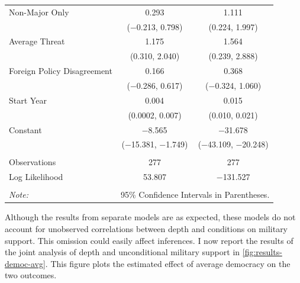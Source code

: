 \documentclass[12pt]{article}
\begin{document}
\begin{table}[!htbp]
\begin{tabular}{@{\extracolsep{5pt}}lcc}
  Non-Major Only & 0.293 & 1.111$^{}$ \\ 
  & ($-$0.213, 0.798) & (0.224, 1.997) \\ 
  Average Threat & 1.175$^{}$ & 1.564$^{}$ \\ 
  & (0.310, 2.040) & (0.239, 2.888) \\ 
  Foreign Policy Disagreement & 0.166 & 0.368 \\ 
  & ($-$0.286, 0.617) & ($-$0.324, 1.060) \\ 
  Start Year & 0.004$^{}$ & 0.015$^{}$ \\ 
  & (0.0002, 0.007) & (0.010, 0.021) \\ 
  Constant & $-$8.565$^{}$ & $-$31.678$^{}$ \\ 
  & ($-$15.381, $-$1.749) & ($-$43.109, $-$20.248) \\ 
 \hline \\[-1.8ex] 
Observations & 277 & 277 \\ 
Log Likelihood & 53.807 & $-$131.527 \\ 
\hline 
\hline \\[-1.8ex] 
\textit{Note:}  & \multicolumn{2}{r}{95\% Confidence Intervals in Parentheses.} \\ 
\end{tabular} 
\end{table} 

Although the results from separate models are as expected, these models do not account for unobserved correlations between depth and conditions on military support. 
This omission could easily affect inferences. 
I now report the results of the joint analysis of depth and unconditional military support in \autoref{fig:results-democ-avg}.
This figure plots the estimated effect of average democracy on the two outcomes. 
\end{document}
